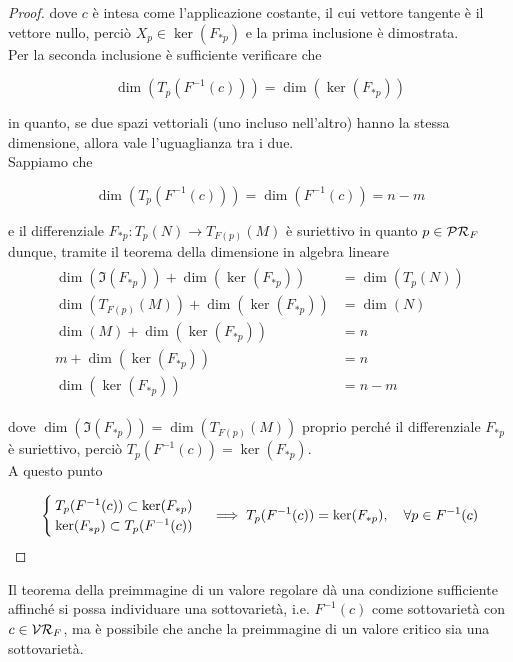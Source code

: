 \begin{proof}
	dove $ c $ è intesa come l'applicazione costante, il cui vettore tangente è il vettore nullo, perciò $ X_{p} \in \ker(F_{*p}) $ e la prima inclusione è dimostrata.\\
	Per la seconda inclusione è sufficiente verificare che
	
	\begin{equation}
		\dim(T_{p}(F^{-1}(c))) = \dim(\ker(F_{*p}))
	\end{equation}

	in quanto, se due spazi vettoriali (uno incluso nell'altro) hanno la stessa dimensione, allora vale l'uguaglianza tra i due.\\
	Sappiamo che
	
	\begin{equation}
		\dim(T_{p}(F^{-1}(c))) = \dim(F^{-1}(c)) = n-m
	\end{equation}

	e il differenziale $ F_{*p} : T_{p}(N) \to T_{F(p)}(M) $ è suriettivo in quanto $ p \in \mathcal{PR}_{F} $ dunque, tramite il teorema della dimensione in algebra lineare
	\begin{align}
		\begin{split}
			\dim(\Im(F_{*p})) + \dim(\ker(F_{*p})) &= \dim(T_{p}(N))\\
			\dim(T_{F(p)}(M)) + \dim(\ker(F_{*p})) &= \dim(N)\\
			\dim(M) + \dim(\ker(F_{*p})) &= n\\
			m + \dim(\ker(F_{*p})) &= n\\
			\dim(\ker(F_{*p})) &= n-m
		\end{split}		
	\end{align}

	dove $ \dim(\Im(F_{*p})) = \dim(T_{F(p)}(M)) $ proprio perché il differenziale $ F_{*p} $ è suriettivo, perciò $ T_{p}(F^{-1}(c)) = \ker(F_{*p}) $.\\
	A questo punto
	
	\begin{equation}
		\begin{cases}
			T_{p}(F^{-1}(c)) \subset \ker(F_{*p})\\
			\ker(F_{*p}) \subset T_{p}(F^{-1}(c))
		\end{cases}%
		\implies %
		T_{p}(F^{-1}(c)) = \ker(F_{*p}) \qcomma \forall p \in F^{-1}(c)
	\end{equation}
\end{proof}

\begin{remark}
	Il teorema della preimmagine di un valore regolare dà una condizione sufficiente affinché si possa individuare una sottovarietà, i.e. $ F^{-1}(c) $ come sottovarietà con $ c \in \mathcal{VR}_{F} $, ma è possibile che anche la preimmagine di un valore critico sia una sottovarietà.
\end{remark}

